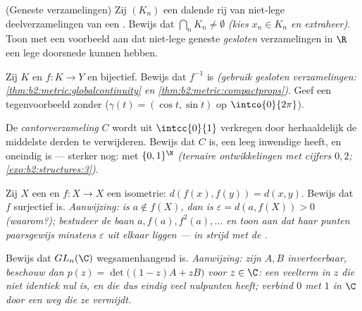 \begin{exercise}[$\star\star$]\label{exo:b2:metric:6}
(Geneste  verzamelingen) Zij $(K_n)$ een dalende rij van
niet-lege  deelverzamelingen van een .
Bewijs dat $\bigcap_n K_n \neq \emptyset$ \emph{(kies $x_n \in K_n$
en extraheer)}. Toon met een voorbeeld aan dat niet-lege geneste
\emph{gesloten} verzamelingen in $\R$ een lege doorsnede kunnen
hebben.
\end{exercise}

\begin{exercise}[$\star\star$]\label{exo:b2:metric:7}
Zij $K$  en $f \colon K \to Y$  en bijectief. Bewijs
dat $f^{-1}$  is \emph{(gebruik gesloten verzamelingen:
\cref{thm:b2:metric:globalcontinuity} en
\cref{thm:b2:metric:compactprops})}. Geef een tegenvoorbeeld zonder
 ($\gamma(t) = (\cos t, \sin t)$ op
$\intco{0}{2\pi}$).
\end{exercise}

\begin{exercise}[$\star\star$]\label{exo:b2:metric:8}
De \emph{cantorverzameling} $C$ wordt uit $\intcc{0}{1}$ verkregen
door herhaaldelijk de  middelste derden te verwijderen. Bewijs
dat $C$  is, een leeg inwendige heeft, en oneindig is ---
sterker nog:  met $\{0,1\}^{\N}$ \emph{(ternaire
ontwikkelingen met cijfers $0,2$; \cref{exo:b2:structures:3})}.
\end{exercise}

\begin{exercise}[$\star\star\star$]\label{exo:b2:metric:9}
Zij $X$ een \emph{}  en $f \colon X \to X$
een isometrie: $d(f(x), f(y)) = d(x, y)$. Bewijs dat $f$ surjectief
is. \emph{Aanwijzing: is $a \notin f(X)$, dan is $\varepsilon =
d(a, f(X)) > 0$ (waarom?); bestudeer de baan $a, f(a), f^2(a),
\dots$ en toon aan dat haar punten paarsgewijs minstens
$\varepsilon$ uit elkaar liggen --- in strijd met de .}
\end{exercise}

\begin{exercise}[$\star\star\star$]\label{exo:b2:metric:10}
Bewijs dat $GL_n(\C)$ wegsamenhangend is. \emph{Aanwijzing: zijn
$A, B$ inverteerbaar, beschouw dan $p(z) = \det\bigl((1 - z)A +
zB\bigr)$ voor $z \in \C$: een veelterm in $z$ die niet identiek
nul is, en die dus eindig veel nulpunten heeft; verbind $0$ met $1$
in $\C$ door een weg die ze vermijdt.}
\end{exercise}


